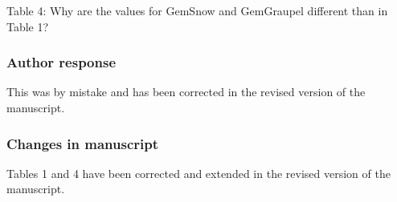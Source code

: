 Table 4: Why are the values for GemSnow and GemGraupel different than in Table 1?

\subsubsection*{Author response}

This was by mistake and has been corrected in the revised version of the
manuscript.

\subsubsection*{Changes in manuscript}

Tables 1 and 4 have been corrected and extended in the revised version
of the manuscript.
%

